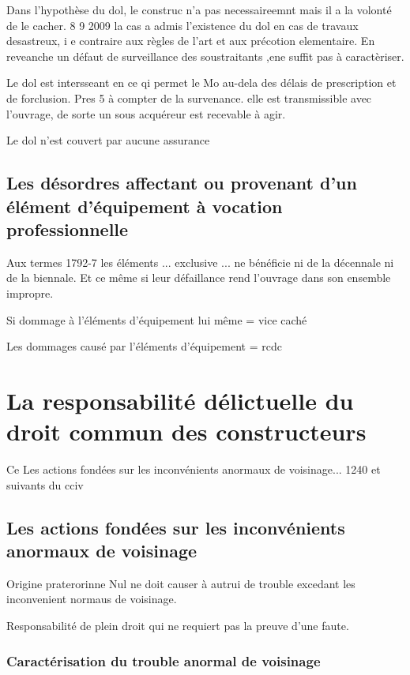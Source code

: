 		Dans l'hypothèse du dol, le construc n'a pas necessaireemnt mais il a la volonté de le cacher. 8 9 2009 la cas a admis l'existence du dol en cas de travaux desastreux, i e contraire aux règles de l'art et aux précotion elementaire. En reveanche un défaut de surveillance des soustraitants ,ene suffit pas à caractèriser.

		Le dol est intersseant en ce qi permet le Mo au-dela des délais de prescription et de forclusion. Pres 5 à compter de la survenance. elle est transmissible avec l'ouvrage, de sorte un sous acquéreur est recevable à agir.

		Le dol n'est couvert par aucune assurance

	\subsection{Les désordres affectant ou provenant d'un élément d'équipement à vocation professionnelle}

		Aux termes 1792-7 les éléments ... exclusive ... ne bénéficie ni de la décennale ni de la biennale. Et ce même si leur défaillance rend l'ouvrage dans son ensemble impropre.

		Si dommage à l'éléments d'équipement lui même = vice caché

		Les dommages causé par l'éléments d'équipement = rcdc

\section{La responsabilité délictuelle du droit commun des constructeurs}

	Ce Les actions fondées sur les inconvénients anormaux de voisinage... 1240 et suivants du cciv

	\subsection{Les actions fondées sur les inconvénients anormaux de voisinage}

		Origine praterorinne Nul ne doit causer à autrui de trouble excedant les inconvenient normaus de voisinage.

		Responsabilité de plein droit qui ne requiert pas la preuve d'une faute.

		\subsubsection{Caractérisation du trouble anormal de voisinage}


